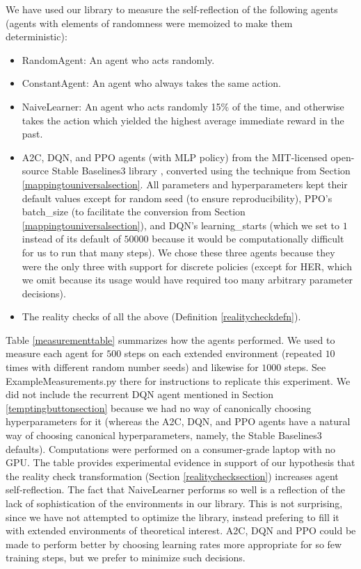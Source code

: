 \documentclass{article}
\begin{document}
We have used our library to measure the self-reflection of the following agents
(agents with elements of randomness were memoized to make them deterministic):
\begin{itemize}
  \item RandomAgent: An agent who acts randomly.
  \item ConstantAgent: An agent who always takes the same action.
  \item NaiveLearner: An agent who acts randomly 15\% of the time, and otherwise
    takes the action which yielded the highest average immediate reward in the past.
  \item A2C, DQN, and PPO agents (with MLP policy)
    from the MIT-licensed open-source Stable Baselines3
    library \cite{stable-baselines3}, converted
    using the technique from Section \ref{mappingtouniversalsection}. All parameters and
    hyperparameters kept their default values except for random seed
    (to ensure reproducibility), PPO's batch\_size (to facilitate the conversion
    from Section \ref{mappingtouniversalsection}), and DQN's
    learning\_starts (which we set to $1$ instead of its default of
    $50000$ because it would be computationally difficult for us to run that many steps).
    We chose these three agents because they were the only three with support for
    discrete policies (except for HER, which we omit because its usage would have required
    too many arbitrary parameter decisions).
  \item The reality checks of all the above (Definition \ref{realitycheckdefn}).
\end{itemize}
Table \ref{measurementtable} summarizes how the agents performed.
We used \cite{library} to measure each agent for $500$ steps on each extended environment
(repeated
$10$ times with different random number seeds) and likewise for $1000$ steps.
See ExampleMeasurements.py there for instructions to
replicate this experiment.
We did not include the recurrent DQN agent mentioned in Section \ref{temptingbuttonsection}
because we had no way of canonically choosing hyperparameters for it (whereas
the A2C, DQN, and PPO agents have a natural way of choosing canonical hyperparameters,
namely, the Stable Baselines3 defaults).
Computations were performed on a consumer-grade laptop with no GPU.
The table provides
experimental evidence in support of our hypothesis that the reality check transformation
(Section \ref{realitychecksection}) increases agent self-reflection.
The fact that NaiveLearner performs so well is a reflection of the
lack of sophistication of the environments in our library. This is not
surprising, since we have not attempted to optimize the library, instead
prefering to fill it with extended environments of theoretical interest.
A2C, DQN and PPO could be made to perform better by choosing learning rates
more appropriate for so few training steps, but we prefer to minimize such
decisions.
\end{document}
